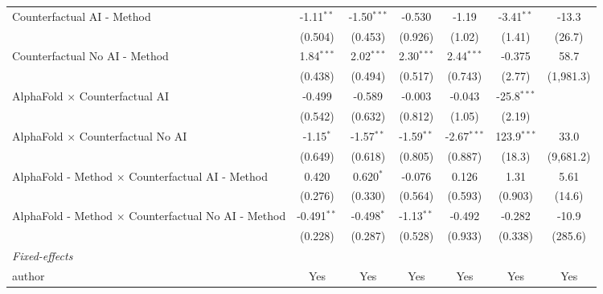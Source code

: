 \begin{tabular}{lcccccc}
   Counterfactual AI - Method                                 & -1.11$^{**}$  & -1.50$^{***}$ & -0.530       & -1.19         & -3.41$^{**}$  & -13.3\\   
                                                              & (0.504)       & (0.453)       & (0.926)      & (1.02)        & (1.41)        & (26.7)\\   
   Counterfactual No AI - Method                              & 1.84$^{***}$  & 2.02$^{***}$  & 2.30$^{***}$ & 2.44$^{***}$  & -0.375        & 58.7\\   
                                                              & (0.438)       & (0.494)       & (0.517)      & (0.743)       & (2.77)        & (1,981.3)\\   
   AlphaFold $\times$ Counterfactual AI                       & -0.499        & -0.589        & -0.003       & -0.043        & -25.8$^{***}$ &   \\   
                                                              & (0.542)       & (0.632)       & (0.812)      & (1.05)        & (2.19)        &   \\   
   AlphaFold $\times$ Counterfactual No AI                    & -1.15$^{*}$   & -1.57$^{**}$  & -1.59$^{**}$ & -2.67$^{***}$ & 123.9$^{***}$ & 33.0\\   
                                                              & (0.649)       & (0.618)       & (0.805)      & (0.887)       & (18.3)        & (9,681.2)\\   
   AlphaFold - Method $\times$ Counterfactual AI - Method     & 0.420         & 0.620$^{*}$   & -0.076       & 0.126         & 1.31          & 5.61\\   
                                                              & (0.276)       & (0.330)       & (0.564)      & (0.593)       & (0.903)       & (14.6)\\   
   AlphaFold - Method $\times$ Counterfactual No AI - Method  & -0.491$^{**}$ & -0.498$^{*}$  & -1.13$^{**}$ & -0.492        & -0.282        & -10.9\\   
                                                              & (0.228)       & (0.287)       & (0.528)      & (0.933)       & (0.338)       & (285.6)\\   
   \midrule
   \emph{Fixed-effects}\\
   author                                                     & Yes           & Yes           & Yes          & Yes           & Yes           & Yes\\  

\end{tabular}
